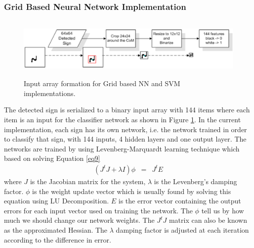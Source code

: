 \documentclass[a4paper,oneside,12pt]{report}
\begin{document}
\subsubsection{Grid Based Neural Network Implementation}
\begin{figure}[ht]
\begin{center}
\includegraphics[width=140mm,height=30mm]{img/nn12.eps}
\caption{Input array formation for Grid based NN and SVM implementations.}
\label{signfig23}
\end{center}
\end{figure}
The detected sign is serialized to a binary input array with 144 items where each item is an input for the classifier network as shown in Figure \ref{signfig23}. In the current implementation, each sign has its own network, i.e. the network trained in order to classify that sign, with 144 inputs, 4 hidden layers and one output layer. The networks are trained by using Levenberg-Marquardt learning technique \cite{wilamowski_efficient_1999} which based on solving Equation \ref{eq9}
\begin{eqnarray}
\label{eq9}
	(J^{t}J + \lambda I)\phi &=& J^{t}E
\end{eqnarray}  
\noindent where $J$ is the Jacobian matrix for the system, $\lambda$ is the Levenberg's damping factor. $\phi$ is the weight update vector which is usually found by solving this equation using LU Decomposition. $E$ is the error vector containing the output errors for each input vector used on training the network. The $\phi$ tell us by how much we should change our network weights. The $J^{t}J$ matrix can also be known as the approximated Hessian. The $\lambda$ damping factor is adjusted at each iteration according to the difference in error.
\end{document}
